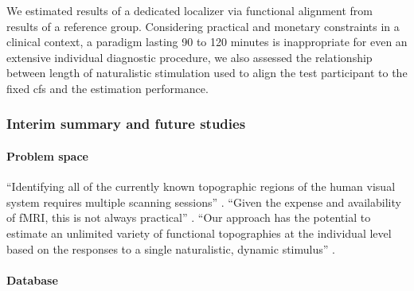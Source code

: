 We estimated results of a dedicated localizer \citep{sengupta2016extension} via
functional alignment from results of a reference group.
Considering practical and monetary constraints in a clinical context, a paradigm
lasting 90 to 120 minutes is inappropriate for even an extensive individual
diagnostic procedure, we also assessed the relationship between length of
naturalistic stimulation used to align the test participant to the fixed
\ac{cfs} and the estimation performance.



\subsubsection{Interim summary and future studies}






\paragraph{Problem space}

%
``Identifying all of the currently known topographic regions of the human visual
system requires multiple scanning sessions'' \citep{wang2015probabilistic}.
%
``Given the expense and availability of fMRI, this is not always practical''
\citep{wang2015probabilistic}.
%
``Our approach has the potential to estimate an unlimited variety of functional
topographies at the individual level based on the responses to a single
naturalistic, dynamic stimulus'' \citep{jiahui2020predicting}.


\paragraph{Database}

